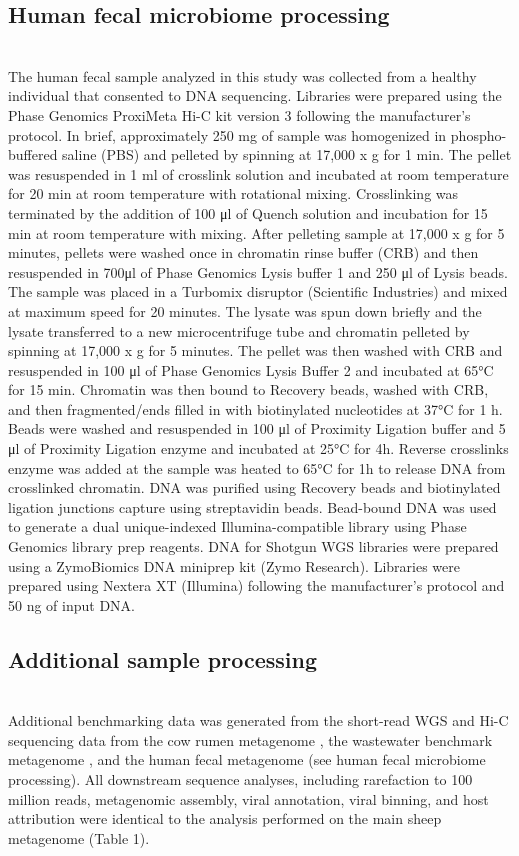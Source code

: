\subsection*{Human fecal microbiome processing} \hfill\\
    The human fecal sample analyzed in this study was collected from a healthy individual that consented to DNA sequencing.  Libraries were prepared using the Phase Genomics ProxiMeta Hi-C kit version 3 following the manufacturer’s protocol.  In brief, approximately 250 mg of sample was homogenized in phospho-buffered saline (PBS) and pelleted by spinning at 17,000 x g for 1 min.  The pellet was resuspended in 1 ml of crosslink solution and incubated at room temperature for 20 min at room temperature with rotational mixing.  Crosslinking was terminated by the addition of 100 μl of Quench solution and incubation for 15 min at room temperature with mixing.  After pelleting sample at 17,000 x g for 5 minutes, pellets were washed once in chromatin rinse buffer (CRB) and then resuspended in 700μl of Phase Genomics Lysis buffer 1 and 250 μl of Lysis beads.  The sample was placed in a Turbomix disruptor (Scientific Industries) and mixed at maximum speed for 20 minutes.  The lysate was spun down briefly and the lysate transferred to a new microcentrifuge tube and chromatin pelleted by spinning at 17,000 x g for 5 minutes.  The pellet was then washed with CRB and resuspended in 100 μl of Phase Genomics Lysis Buffer 2 and incubated at 65°C for 15 min.  Chromatin was then bound to Recovery beads, washed with CRB, and then fragmented/ends filled in with biotinylated nucleotides at 37°C for 1 h.  Beads were washed and resuspended in 100 μl of Proximity Ligation buffer and 5 μl of Proximity Ligation enzyme and incubated at 25°C for 4h.  Reverse crosslinks enzyme was added at the sample was heated to 65°C for 1h to release DNA from crosslinked chromatin.  DNA was purified using Recovery beads and biotinylated ligation junctions capture using streptavidin beads. Bead-bound DNA was used to generate a dual unique-indexed Illumina-compatible library using Phase Genomics library prep reagents. DNA for Shotgun WGS libraries were prepared using a ZymoBiomics DNA miniprep kit (Zymo Research).  Libraries were prepared using Nextera XT (Illumina) following the manufacturer’s protocol and 50 ng of input DNA.

\subsection*{Additional sample processing} \hfill\\
    Additional benchmarking data was generated from the short-read WGS and Hi-C sequencing data from the cow rumen metagenome \cite{RN2903}, the wastewater benchmark metagenome \cite{RN2904}, and the human fecal metagenome (see human fecal microbiome processing). All downstream sequence analyses, including rarefaction to 100 million reads, metagenomic assembly, viral annotation, viral binning, and host attribution were identical to the analysis performed on the main sheep metagenome (Table 1).
    
